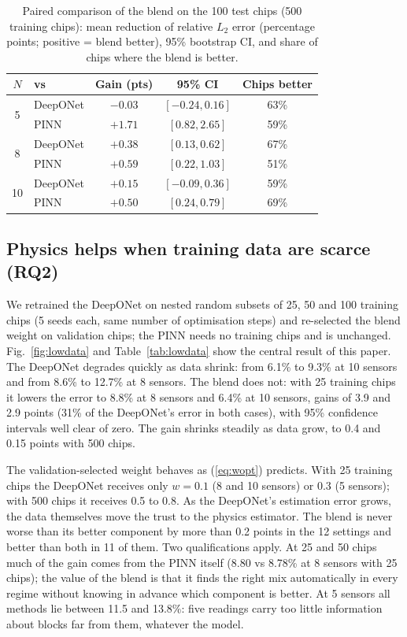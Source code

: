 \documentclass[journal]{IEEEtran}
\begin{document}
\begin{table}[t]
\caption{Paired comparison of the blend on the 100 test chips (500 training chips): mean reduction of relative $L_2$ error (percentage points; positive = blend better), 95\% bootstrap CI, and share of chips where the blend is better.}
\label{tab:paired}
\centering
\footnotesize
\setlength{\tabcolsep}{3.5pt}
\begin{tabular}{@{}c l c c c@{}}
\toprule
$N$ & vs & Gain (pts) & 95\% CI & Chips better \\
\midrule
\multirow{2}{*}{5} & DeepONet & $-0.03$ & $[-0.24, 0.16]$ & 63\% \\
 & PINN & $+1.71$ & $[0.82, 2.65]$ & 59\% \\
\multirow{2}{*}{8} & DeepONet & $+0.38$ & $[0.13, 0.62]$ & 67\% \\
 & PINN & $+0.59$ & $[0.22, 1.03]$ & 51\% \\
\multirow{2}{*}{10} & DeepONet & $+0.15$ & $[-0.09, 0.36]$ & 59\% \\
 & PINN & $+0.50$ & $[0.24, 0.79]$ & 69\% \\
\bottomrule
\end{tabular}
\end{table}

\subsection{Physics helps when training data are scarce (RQ2)}
We retrained the DeepONet on nested random subsets of 25, 50 and 100 training chips (5 seeds each, same number of optimisation steps) and re-selected the blend weight on validation chips; the PINN needs no training chips and is unchanged.
Fig.~\ref{fig:lowdata} and Table~\ref{tab:lowdata} show the central result of this paper.
The DeepONet degrades quickly as data shrink: from 6.1\% to 9.3\% at 10 sensors and from 8.6\% to 12.7\% at 8 sensors.
The blend does not: with 25 training chips it lowers the error to 8.8\% at 8 sensors and 6.4\% at 10 sensors, gains of 3.9 and 2.9 points (31\% of the DeepONet's error in both cases), with 95\% confidence intervals well clear of zero.
The gain shrinks steadily as data grow, to 0.4 and 0.15 points with 500 chips.

The validation-selected weight behaves as (\ref{eq:wopt}) predicts.
With 25 training chips the DeepONet receives only $w=0.1$ (8 and 10 sensors) or 0.3 (5 sensors); with 500 chips it receives 0.5 to 0.8.
As the DeepONet's estimation error grows, the data themselves move the trust to the physics estimator.
The blend is never worse than its better component by more than 0.2 points in the 12 settings and better than both in 11 of them.
Two qualifications apply.
At 25 and 50 chips much of the gain comes from the PINN itself (8.80 vs 8.78\% at 8 sensors with 25 chips); the value of the blend is that it finds the right mix automatically in every regime without knowing in advance which component is better.
At 5 sensors all methods lie between 11.5 and 13.8\%: five readings carry too little information about blocks far from them, whatever the model.
\end{document}
